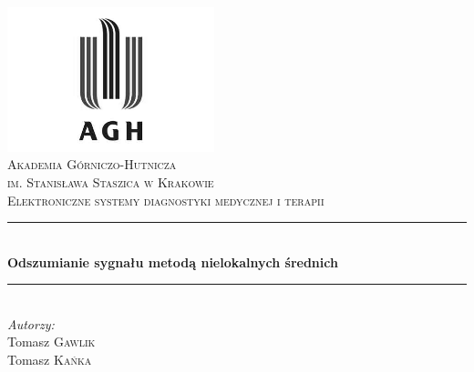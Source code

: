 \begin{titlepage}

\newcommand{\HRule}{\rule{\linewidth}{0.5mm}}

\center
 

\includegraphics[width=6cm]{./img/logo.png}\\[1cm]
 
 

\textsc{\LARGE Akademia Górniczo-Hutnicza \\[0.2cm]
im. Stanisława Staszica w Krakowie}\\[1.5cm]

\textsc{\Large Elektroniczne systemy diagnostyki medycznej i terapii}\\[0.5cm]


\HRule \\[0.5cm]
{ \huge \bfseries Odszumianie sygnału metodą nielokalnych średnich}\\[0.3cm]
\HRule \\[1.5cm]

\flushright
\Large \emph{Autorzy:}\\
Tomasz \textsc{Gawlik}\\[0.1cm]  %
Tomasz \textsc{Kańka}\\[3cm]        %


\end{titlepage}
